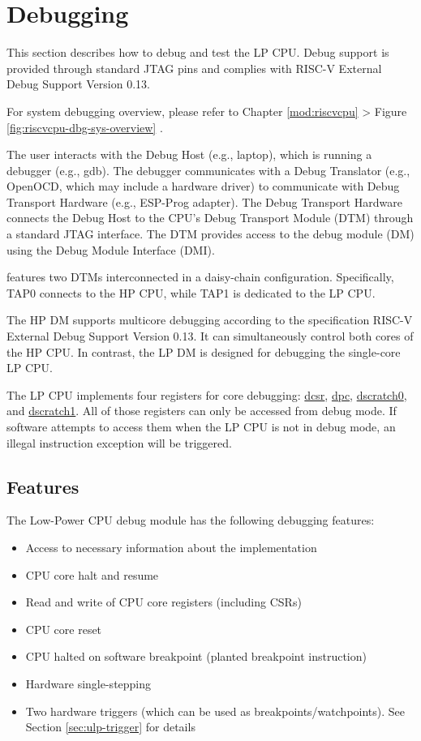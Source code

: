 \documentclass[main\_\_EN.tex]{subfiles}
\begin{document}
\section{Debugging}

This section describes how to debug and test the LP CPU. Debug support is provided through standard JTAG pins and complies with RISC-V External Debug Support Version 0.13.

For \chipname{} system debugging overview, please refer to Chapter \ref{mod:riscvcpu} \textit{} > Figure \ref{fig:riscvcpu-dbg-sys-overview} \textit{}.

The user interacts with the Debug Host (e.g., laptop), which is running a debugger (e.g., gdb). The debugger communicates with a Debug Translator (e.g., OpenOCD, which may include a hardware driver) to communicate with Debug Transport Hardware (e.g., ESP-Prog adapter). The Debug Transport Hardware connects the Debug Host to the CPU's Debug Transport Module (DTM) through a standard JTAG interface. The DTM provides access to the debug module (DM) using the Debug Module Interface (DMI).

\chipname{} features two DTMs interconnected in a daisy-chain configuration. Specifically, TAP0 connects to the HP CPU, while TAP1 is dedicated to the LP CPU.

The HP DM supports multicore debugging according to the specification RISC-V External Debug Support Version 0.13. It can simultaneously control both cores of the HP CPU. In contrast, the LP DM is designed for debugging the single-core LP CPU.

The LP CPU implements four registers for core debugging: \hyperref[regdesc:LPDCSR]{dcsr}, \hyperref[regdesc:LPDPC]{dpc}, \hyperref[regdesc:LPDSCRATCH0]{dscratch0}, and \hyperref[regdesc:LPDSCRATCH1]{dscratch1}. All of those registers can only be accessed from debug mode. If software attempts to access them when the LP CPU is not in debug mode, an illegal instruction exception will be triggered.

\subsection{Features}
The Low-Power CPU debug module has the following debugging features:
\begin{itemize}
    \item Access to necessary information about the implementation
    \item CPU core halt and resume
    \item Read and write of CPU core registers (including CSRs)
    \item CPU core reset
    \item CPU halted on software breakpoint (planted breakpoint instruction)
    \item Hardware single-stepping
    \item Two hardware triggers (which can be used as breakpoints/watchpoints). See Section \ref{sec:ulp-trigger} for details
\end{itemize}
\end{document}
